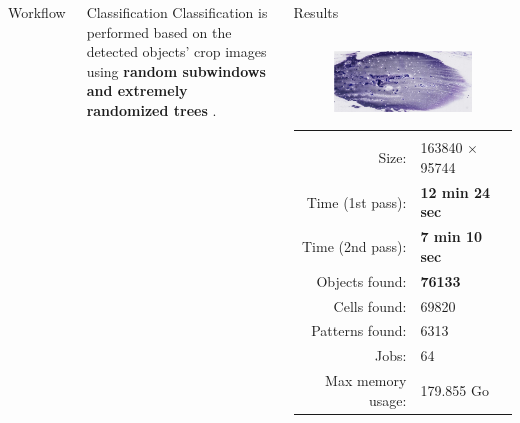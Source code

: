 \documentclass{beamer}
\begin{document}
\begin{frame}
\begin{columns}[t]
\begin{exampleblock}{Workflow}
\end{exampleblock}

\begin{exampleblock}{Classification}
Classification is performed based on the detected objects' crop images using \textbf{random subwindows and extremely randomized trees} \cite{Maree201617}.
\end{exampleblock}

\begin{exampleblock}{Results}

	\begin{columns}
		\begin{column}{0.48\linewidth}
			\begin{figure}
				\center
				\includegraphics[scale=0.6]{images/728725.png}
			\end{figure}
			
			\begin{tabular}{rl}
				& \\
				Size: & 163840 $\times$ 95744\\
				Time (1st pass): & \textbf{12 min 24 sec} \\
				Time (2nd pass): & \textbf{7 min 10 sec}  \\
				Objects found: & \textbf{76133} \\
				Cells found: & 69820 \\
				Patterns found: & 6313 \\
				Jobs: & 64 \\
				Max memory usage: & 179.855 Go \\
			\end{tabular}
		\end{column}


\end{columns}
\end{exampleblock}
\end{columns}
\end{frame}
\end{document}
